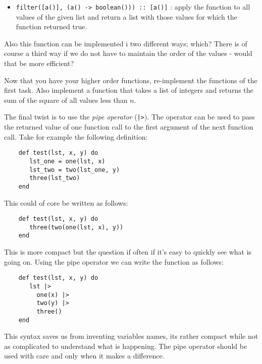 \documentclass[a4paper,11pt]{article}
\begin{document}
  \begin{itemize}

  \item {\tt filter([a()], (a() -> boolean())) :: [a()]}
    : apply the function to all values of the given list and return a
    list with those values for which the function returned true.

  \end{itemize}

  Also this function can be implemented i two different ways; which?
  There is of course a third way if we do not have to maintain the
  order of the values - would that be more efficient?

  Now that you have your higher order functions, re-implement the
  functions of the first task. Also implement a function that takes a
  list of integers and returns the sum of the square of all values
  less than $n$.

  The final twist is to use the {\em pipe operator} ({\tt |>}). The
  operator can be used to pass the returned value of one function call
  to the first argument of the next function call. Take for example the following definition:

  \begin{verbatim}
    def test(lst, x, y) do
       lst_one = one(lst, x)
       lst_two = two(lst_one, y)
       three(lst_two)
    end
  \end{verbatim} 

  This could of core be written as follows:

  \begin{verbatim}
    def test(lst, x, y) do
       three(two(one(lst, x), y))
    end
  \end{verbatim}   

  This is more compact but the question if often if it's easy to
  quickly see what is going on.  Using the pipe operator we can write
  the function as follows:

  \begin{verbatim}
    def test(lst, x, y) do
       lst |>
         one(x) |>
         two(y) |>
         three()
    end
  \end{verbatim}

  This syntax saves us from inventing variables names, its rather
  compact while not as complicated to understand what is
  happening. The pipe operator should be used with care and only when
  it makes a difference.

  
\end{document}
